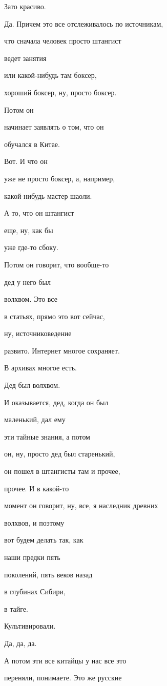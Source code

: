 Зато красиво.

Да. Причем это все отслеживалось по источникам,

что сначала человек просто штангист

ведет занятия

или какой-нибудь там боксер,

хороший боксер, ну, просто боксер.

Потом он

начинает заявлять о том, что он

обучался в Китае.

Вот. И что он

уже не просто боксер, а, например,

какой-нибудь мастер шаоли.

А то, что он штангист

еще, ну, как бы

уже где-то сбоку.

Потом он говорит, что вообще-то

дед у него был

волхвом. Это все

в статьях, прямо это вот сейчас,

ну, источниковедение

развито. Интернет многое сохраняет.

В архивах многое есть.

Дед был волхвом.

И оказывается, дед, когда он был

маленький, дал ему

эти тайные знания, а потом

он, ну, просто дед был старенький,

он пошел в штангисты там и прочее,

прочее. И в какой-то

момент он говорит, ну, все, я наследник древних

волхвов, и поэтому

вот будем делать так, как

наши предки пять

поколений, пять веков назад

в глубинах Сибири,

в тайге.

Культивировали.

Да, да, да.

А потом эти все китайцы у нас все это

переняли, понимаете. Это же русские


